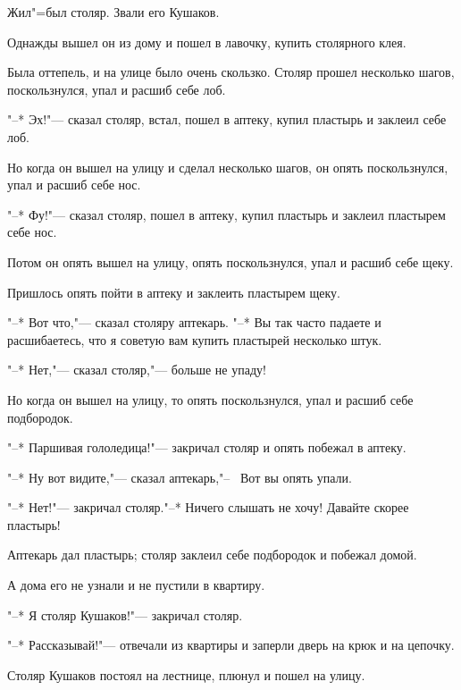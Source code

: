 Жил"=был столяр. Звали его  Кушаков.

Однажды  вышел  он из дому и пошел в лавочку, купить столярного клея.

Была  оттепель,  и  на  улице было очень скользко. Столяр прошел несколько шагов, поскользнулся, упал и расшиб себе лоб.

"--* Эх!"--- сказал  столяр,  встал,  пошел в аптеку, купил пластырь и заклеил себе лоб.
    
Но когда он вышел на улицу и сделал  несколько шагов,  он опять поскользнулся, упал и расшиб себе нос.

"--* Фу!"--- сказал столяр, пошел в  аптеку, купил пластырь и заклеил пластырем себе нос.

Потом он опять  вышел  на  улицу,  опять поскользнулся, упал и расшиб себе щеку.

Пришлось опять пойти в аптеку и заклеить пластырем щеку.

"--* Вот что,"---  сказал столяру аптекарь. "--* Вы так часто  падаете и расшибаетесь, что я советую вам купить пластырей несколько штук.

"--* Нет,"--- сказал столяр,"--- больше не упаду!

Но когда он вышел на улицу, то опять поскользнулся, упал и расшиб себе подбородок.

"--* Паршивая гололедица!"---  закричал столяр и опять побежал в аптеку.

"--* Ну вот видите,"---  сказал аптекарь,"--~ Вот вы опять упали.

"--* Нет!"--- закричал столяр."--*  Ничего слышать не хочу! Давайте скорее пластырь!

Аптекарь  дал пластырь;  столяр  заклеил себе подбородок и побежал домой.

А дома его не узнали и не пустили в квартиру.

"--* Я столяр Кушаков!"--- закричал столяр.
    
"--* Рассказывай!"---  отвечали из квартиры и заперли дверь на крюк и на цепочку.

Столяр Кушаков постоял на лестнице, плюнул и пошел на улицу.